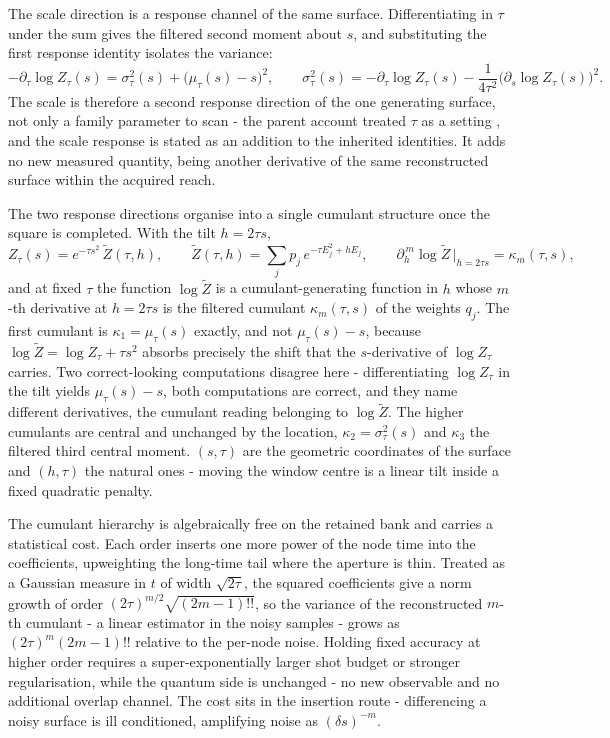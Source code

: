The scale direction is a response channel of the same surface. Differentiating in $\tau$ under the sum gives the filtered second moment about $s$, and substituting the first response identity isolates the variance:
\begin{equation}\label{res:tau-direction-response}
-\partial_\tau\log Z_\tau(s)=\sigma_\tau^{2}(s)+\bigl(\mu_\tau(s)-s\bigr)^{2},\qquad \sigma_\tau^{2}(s)=-\partial_\tau\log Z_\tau(s)-\frac{1}{4\tau^{2}}\bigl(\partial_s\log Z_\tau(s)\bigr)^{2}.
\end{equation}
The scale is therefore a second response direction of the one generating surface, not only a family parameter to scan - the parent account treated $\tau$ as a setting \cite{mccaul2025snacks}, and the scale response is stated as an addition to the inherited identities. It adds no new measured quantity, being another derivative of the same reconstructed surface within the acquired reach.

The two response directions organise into a single cumulant structure once the square is completed. With the tilt $h=2\tau s$,
\begin{equation}\label{thm:natural-parameters-cumulants}
Z_\tau(s)=e^{-\tau s^{2}}\,\widetilde Z(\tau,h),\qquad \widetilde Z(\tau,h)=\sum_j p_j\,e^{-\tau E_j^{2}+hE_j},\qquad \partial_h^{\,m}\log\widetilde Z\,\Big|_{h=2\tau s}=\kappa_m(\tau,s),
\end{equation}
and at fixed $\tau$ the function $\log\widetilde Z$ is a cumulant-generating function in $h$ whose $m$-th derivative at $h=2\tau s$ is the filtered cumulant $\kappa_m(\tau,s)$ of the weights $q_j$. The first cumulant is $\kappa_1=\mu_\tau(s)$ exactly, and not $\mu_\tau(s)-s$, because $\log\widetilde Z=\log Z_\tau+\tau s^{2}$ absorbs precisely the shift that the $s$-derivative of $\log Z_\tau$ carries. Two correct-looking computations disagree here - differentiating $\log Z_\tau$ in the tilt yields $\mu_\tau(s)-s$, both computations are correct, and they name different derivatives, the cumulant reading belonging to $\log\widetilde Z$. The higher cumulants are central and unchanged by the location, $\kappa_2=\sigma_\tau^{2}(s)$ and $\kappa_3$ the filtered third central moment. $(s,\tau)$ are the geometric coordinates of the surface and $(h,\tau)$ the natural ones - moving the window centre is a linear tilt inside a fixed quadratic penalty.

The cumulant hierarchy is algebraically free on the retained bank and carries a statistical cost. Each order inserts one more power of the node time into the coefficients, upweighting the long-time tail where the aperture is thin. Treated as a Gaussian measure in $t$ of width $\sqrt{2\tau}$, the squared coefficients give a norm growth of order $(2\tau)^{m/2}\sqrt{(2m-1)!!}$, so the variance of the reconstructed $m$-th cumulant - a linear estimator in the noisy samples - grows as $(2\tau)^{m}(2m-1)!!$ relative to the per-node noise. Holding fixed accuracy at higher order requires a super-exponentially larger shot budget or stronger regularisation, while the quantum side is unchanged - no new observable and no additional overlap channel. The cost sits in the insertion route - differencing a noisy surface is ill conditioned, amplifying noise as $(\delta s)^{-m}$.

